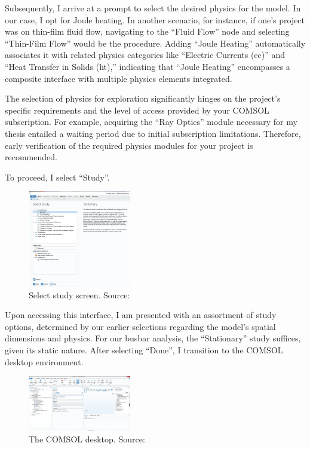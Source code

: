 Subsequently, I arrive at a prompt to select the desired physics for the model. In our case, I opt for Joule heating. In another scenario, for instance, if one's project was on thin-film fluid flow, navigating to the ``Fluid Flow'' node and selecting ``Thin-Film Flow'' would be the procedure. Adding ``Joule Heating'' automatically associates it with related physics categories like ``Electric Currents (ec)'' and ``Heat Transfer in Solids (ht),'' indicating that ``Joule Heating'' encompasses a composite interface with multiple physics elements integrated.

The selection of physics for exploration significantly hinges on the project's specific requirements and the level of access provided by your COMSOL subscription. For example, acquiring the ``Ray Optics'' module necessary for my thesis entailed a waiting period due to initial subscription limitations. Therefore, early verification of the required physics modules for your project is recommended.

To proceed, I select ``Study''.

\begin{figure}[ht!]
  \centering
  \includegraphics[width=0.4\textwidth]{Chapters/Figures/Chapter 3 Figures/Select Study.png}
  \caption{Select study screen. Source: \cite{multiphysics__modeling_nodate}}
  \label{fig:Select Study}
\end{figure}

Upon accessing this interface, I am presented with an assortment of study options, determined by our earlier selections regarding the model's spatial dimensions and physics. For our busbar analysis, the ``Stationary'' study suffices, given its static nature. After selecting ``Done'', I transition to the COMSOL desktop environment.

\begin{figure}[ht!]
  \centering
  \includegraphics[width=0.4\textwidth]{Chapters/Figures/Chapter 3 Figures/Initial COMSOL Desktop.png}
  \caption{The COMSOL desktop. Source: \cite{multiphysics__modeling_nodate}}
  \label{fig:The COMSOL desktop}
\end{figure}


